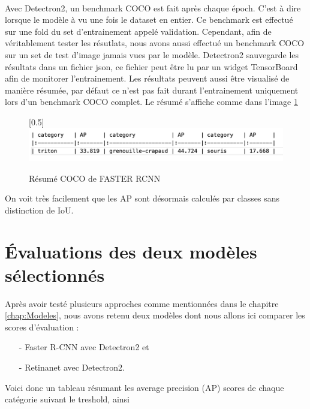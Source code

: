 \paragraph{}
Avec Detectron2, un benchmark COCO est fait après chaque époch. C'est à dire lorsque le modèle à vu une fois le dataset en entier. Ce benchmark est effectué sur une fold du set d'entrainement appelé validation. Cependant, afin de véritablement tester les résutlats, nous avons aussi effectué un benchmark COCO sur un set de test d'image jamais vues par le modèle. 
Detectron2 sauvegarde les résultats dans un fichier json, ce fichier peut être lu par un widget TensorBoard afin de monitorer l'entrainement.
Les résultats peuvent aussi être visualisé de manière résumée, par défaut ce n'est pas fait durant l'entrainement uniquement lors d'un benchmark COCO complet. Le résumé s'affiche comme dans l'image \ref{fig:eval_coco_benchmark_resume} 
\begin{figure}
    \centering
    \scalebox{0.5}[0.5]{\includegraphics[width=\textwidth]{images/eval_coco_benchmark_resume.png}}
    \caption{Résumé COCO de FASTER RCNN}
    \label{fig:eval_coco_benchmark_resume}
\end{figure}
On voit très facilement que les AP sont désormais calculés par classes sans distinction de IoU. 




\section{Évaluations des deux modèles sélectionnés}

Après avoir testé plusieurs approches comme mentionnées dans le chapitre \ref{chap:Modeles}, nous avons retenu deux modèles dont nous allons ici comparer les scores d'évaluation :

\begin{itemize}
    \item[-] Faster R-CNN avec Detectron2 et
    \item[-] Retinanet avec Detectron2.
\end{itemize}

Voici donc un tableau résumant les average precision (AP) scores de chaque catégorie suivant le treshold, ainsi 


